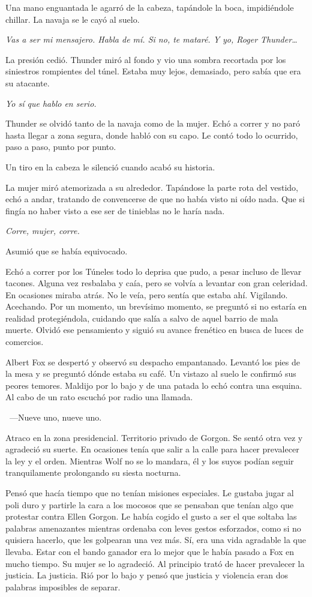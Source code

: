 Una mano enguantada le agarró de la cabeza, tapándole la boca, impidiéndole chillar. La navaja se le cayó al suelo.

\emph{Vas a ser mi mensajero. Habla de mí. Si no, te mataré. Y yo, Roger Thunder\dots}

La presión cedió. Thunder miró al fondo y vio una sombra recortada por los siniestros rompientes del túnel. Estaba muy lejos, demasiado, pero sabía que era su atacante.

\emph{Yo sí que hablo en serio.}

Thunder se olvidó tanto de la navaja como de la mujer. Echó a correr y no paró hasta llegar a zona segura, donde habló con su capo. Le contó todo lo ocurrido, paso a paso, punto por punto.

Un tiro en la cabeza le silenció cuando acabó su historia.

La mujer miró atemorizada a su alrededor. Tapándose la parte rota del vestido, echó a andar, tratando de convencerse de que no había visto ni oído nada. Que si fingía no haber visto a ese ser de tinieblas no le haría nada.

\emph{Corre, mujer, corre.}

Asumió que se había equivocado.

Echó a correr por los Túneles todo lo deprisa que pudo, a pesar incluso de llevar tacones. Alguna vez resbalaba y caía, pero se volvía a levantar con gran celeridad. En ocasiones miraba atrás. No le veía, pero sentía que estaba ahí. Vigilando. Acechando. Por un momento, un brevísimo momento, se preguntó si no estaría en realidad protegiéndola, cuidando que salía a salvo de aquel barrio de mala muerte. Olvidó ese pensamiento y siguió su avance frenético en busca de luces de comercios.

\bigskip\noindent
Albert Fox se despertó y observó su despacho empantanado. Levantó los pies de la mesa y se preguntó dónde estaba su café. Un vistazo al suelo le confirmó sus peores temores. Maldijo por lo bajo y de una patada lo echó contra una esquina. Al cabo de un rato escuchó por radio una llamada.

~---Nueve uno, nueve uno.

Atraco en la zona presidencial. Territorio privado de Gorgon. Se sentó otra vez y agradeció su suerte. En ocasiones tenía que salir a la calle para hacer prevalecer la ley y el orden. Mientras Wolf no se lo mandara, él y los suyos podían seguir tranquilamente prolongando su siesta nocturna.

Pensó que hacía tiempo que no tenían misiones especiales. Le gustaba jugar al poli duro y partirle la cara a los mocosos que se pensaban que tenían algo que protestar contra Ellen Gorgon. Le había cogido el gusto a ser el que soltaba las palabras amenazantes mientras ordenaba con leves gestos esforzados, como si no quisiera hacerlo, que les golpearan una vez más. Sí, era una vida agradable la que llevaba. Estar con el bando ganador era lo mejor que le había pasado a Fox en mucho tiempo. Su mujer se lo agradeció. Al principio trató de hacer prevalecer la justicia. La justicia. Rió por lo bajo y pensó que justicia y violencia eran dos palabras imposibles de separar.

